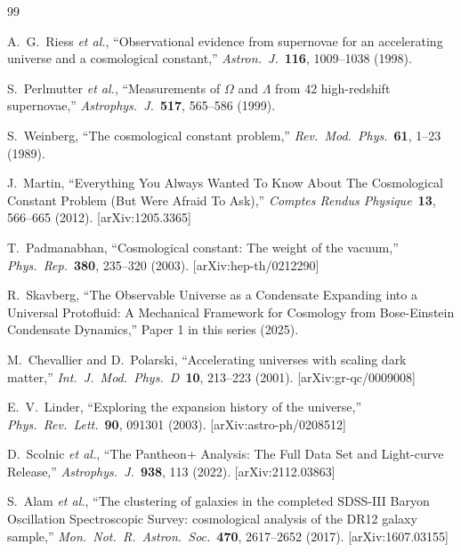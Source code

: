 \documentclass[11pt,a4paper]{article}
\theoremstyle{definition}
\theoremstyle{remark}
\begin{document}
\begin{thebibliography}{99}

A.~G.~Riess \emph{et al.}, ``Observational evidence from supernovae for an accelerating universe and a cosmological constant,'' \emph{Astron.\ J.}\ \textbf{116}, 1009--1038 (1998).

S.~Perlmutter \emph{et al.}, ``Measurements of $\Omega$ and $\Lambda$ from 42 high-redshift supernovae,'' \emph{Astrophys.\ J.}\ \textbf{517}, 565--586 (1999).

S.~Weinberg, ``The cosmological constant problem,'' \emph{Rev.\ Mod.\ Phys.}\ \textbf{61}, 1--23 (1989).

J.~Martin, ``Everything You Always Wanted To Know About The Cosmological Constant Problem (But Were Afraid To Ask),'' \emph{Comptes Rendus Physique}\ \textbf{13}, 566--665 (2012). [arXiv:1205.3365]

T.~Padmanabhan, ``Cosmological constant: The weight of the vacuum,'' \emph{Phys.\ Rep.}\ \textbf{380}, 235--320 (2003). [arXiv:hep-th/0212290]

R.~Skavberg, ``The Observable Universe as a Condensate Expanding into a Universal Protofluid: A Mechanical Framework for Cosmology from Bose-Einstein Condensate Dynamics,'' Paper 1 in this series (2025).

M.~Chevallier and D.~Polarski, ``Accelerating universes with scaling dark matter,'' \emph{Int.\ J.\ Mod.\ Phys.\ D}\ \textbf{10}, 213--223 (2001). [arXiv:gr-qc/0009008]

E.~V.~Linder, ``Exploring the expansion history of the universe,'' \emph{Phys.\ Rev.\ Lett.}\ \textbf{90}, 091301 (2003). [arXiv:astro-ph/0208512]

D.~Scolnic \emph{et al.}, ``The Pantheon+ Analysis: The Full Data Set and Light-curve Release,'' \emph{Astrophys.\ J.}\ \textbf{938}, 113 (2022). [arXiv:2112.03863]

S.~Alam \emph{et al.}, ``The clustering of galaxies in the completed SDSS-III Baryon Oscillation Spectroscopic Survey: cosmological analysis of the DR12 galaxy sample,'' \emph{Mon.\ Not.\ R.\ Astron.\ Soc.}\ \textbf{470}, 2617--2652 (2017). [arXiv:1607.03155]


\end{thebibliography}
\end{document}
